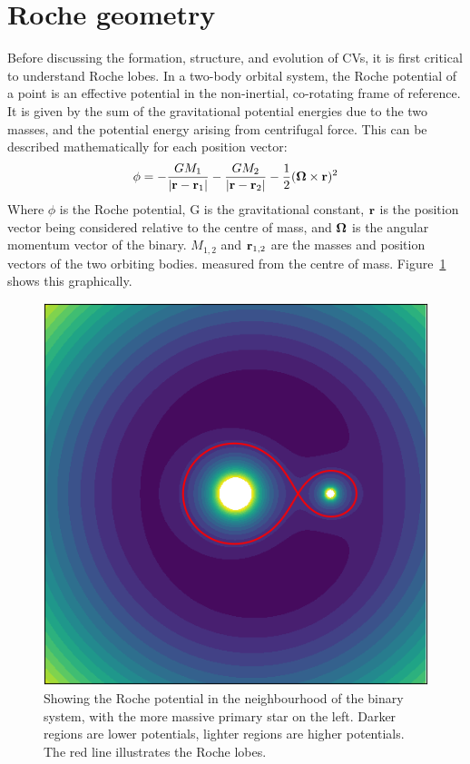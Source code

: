 \section{Roche geometry}
\label{sect:introduction:Roche geometry}

Before discussing the formation, structure, and evolution of CVs, it is first critical to understand Roche lobes.
In a two-body orbital system, the Roche potential of a point is an effective potential in the non-inertial, co-rotating frame of reference. It is given by the sum of the gravitational potential energies due to the two masses, and the potential energy arising from centrifugal force. This can be described mathematically for each position vector:
\begin{equation}
    {\bf \phi} = -\frac{G M_1}{|{\bf r - r}_1|} - \frac{G M_2}{|{\bf r - r}_2|} - \frac{1}{2}({\bf \Omega} \times {\bf r})^2
\end{equation}
Where $\phi$ is the Roche potential, G is the gravitational constant, $\bf r$ is the position vector being considered relative to the centre of mass, and $\bf \Omega$ is the angular momentum vector of the binary. $M_{1,2}$ and ${\bf r}_{1,2}$ are the masses and position vectors of the two orbiting bodies. measured from the centre of mass. Figure~\ref{fig:roche} shows this graphically. 

\begin{figure}
    \centering
    \includegraphics[width=.6\columnwidth]{figures/introduction/roche.png}
    \caption{Showing the Roche potential in the neighbourhood of the binary system, with the more massive primary star on the left. Darker regions are lower potentials, lighter regions are higher potentials. The red line illustrates the Roche lobes.}
    \label{fig:roche}
\end{figure}

